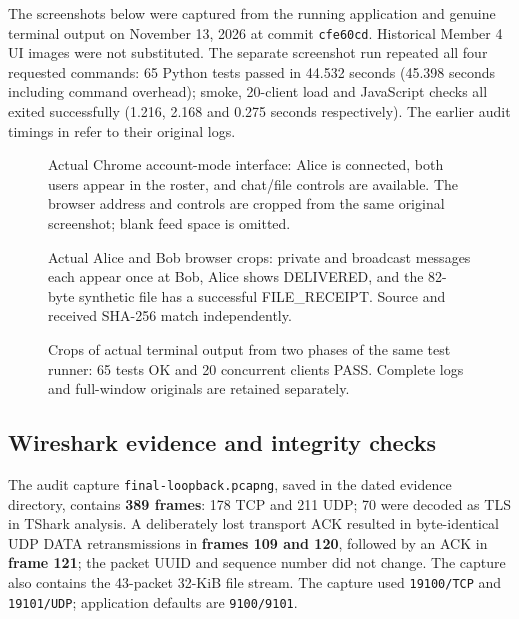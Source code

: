 The screenshots below were captured from the running application and genuine terminal output on November 13, 2026 at commit \texttt{cfe60cd}. Historical Member 4 UI images were not substituted. The separate screenshot run repeated all four requested commands: 65 Python tests passed in 44.532 seconds (45.398 seconds including command overhead); smoke, 20-client load and JavaScript checks all exited successfully (1.216, 2.168 and 0.275 seconds respectively). The earlier audit timings in  refer to their original logs.

\begin{figure}[H]
\centering
{}
\caption{Actual Chrome account-mode interface: Alice is connected, both users appear in the roster, and chat/file controls are available. The browser address and controls are cropped from the same original screenshot; blank feed space is omitted.}
\label{fig:browser-evidence}
\end{figure}

\begin{figure}[H]
\centering
{}
\caption{Actual Alice and Bob browser crops: private and broadcast messages each appear once at Bob, Alice shows DELIVERED, and the 82-byte synthetic file has a successful FILE\_RECEIPT. Source and received SHA-256 match independently.}
\label{fig:file-browser-evidence}
\end{figure}

\begin{figure}[H]
\centering
{}
\caption{Crops of actual terminal output from two phases of the same test runner: 65 tests OK and 20 concurrent clients PASS. Complete logs and full-window originals are retained separately.}
\label{fig:terminal-evidence}
\end{figure}

\subsection{Wireshark evidence and integrity checks}

The audit capture \texttt{final-loopback.pcapng}, saved in the dated evidence directory, contains \textbf{389 frames}: 178 TCP and 211 UDP; 70 were decoded as TLS in TShark analysis. A deliberately lost transport ACK resulted in byte-identical UDP DATA retransmissions in \textbf{frames 109 and 120}, followed by an ACK in \textbf{frame 121}; the packet UUID and sequence number did not change. The capture also contains the 43-packet 32-KiB file stream. The capture used \texttt{19100/TCP} and \texttt{19101/UDP}; application defaults are \texttt{9100/9101}.

